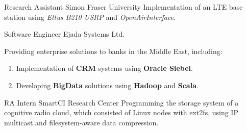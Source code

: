 \documentclass[letterpaper]{twentysecondcv} %
\begin{document}
\begin{twenty}
               {Research Assistant}
               {Simon Fraser University}
               {Implementation of an LTE base station using \textit{Ettus B210 USRP} and \textit{OpenAirInterface}.
               }


               {Software Engineer}
               {Ejada Systems Ltd.}
               {Providing enterprise solutions to banks in the Middle East, including:
                \begin{enumerate}
                    \item Implementation of \textbf{CRM} systems using \textbf{Oracle Siebel}.
                    \item Developing \textbf{BigData} solutions using
                          \textbf{Hadoop} and \textbf{Scala}.
                \end{enumerate}}

               {RA Intern}
               {SmartCI Research Center}
               {Programming the storage system of a cognitive radio cloud, which consisted of
                Linux nodes with ext2fs, using IP multicast and filesystem-aware data compression.}

\end{twenty}
\end{document}
